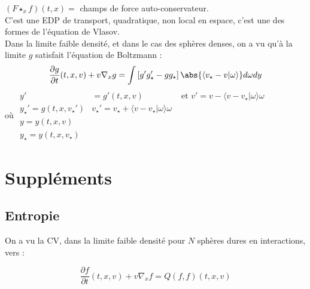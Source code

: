 \documentclass[12pt,a4paper]{article}
\begin{document}
	$(F\star_x f)(t,x) = $ champs de force auto-conservateur.\\
	C'est une EDP de transport, quadratique, non local en espace, c'est une des formes de l'équation de Vlasov.\\
	Dans la limite faible densité, et dans le cas des sphères denses, on a vu qu'à la limite $g$ satisfait l'équation de Boltzmann :
	\[
	\dfrac{\partial g}{\partial t}(t,x,v) + v\nabla_x g = \displaystyle\int\left[g'g'_\star - gg_\star\right]\abs{\langle v_\star - v|\omega\rangle}d\omega dy
	\]
	où $\begin{aligned}
		y' & = g'(t,x,v) & \text{ et } v' = v-\langle v-v_\star|\omega\rangle\omega\\
		y_\star' = g(t,x,v_\star') & v_\star' = v_\star + \langle v-v_\star|\omega\rangle\omega \\
		y = y(t,x,v)\\
		 y_\star = y(t,x,v_\star)
	\end{aligned}$

\section{Suppléments}
	
	\subsection{Entropie}
	
	On a vu la CV, dans la limite faible densité pour $N$ sphères dures en interactions, vers :
	
	\[
	\dfrac{\partial f}{\partial t}(t,x,v) + v\nabla_x f = Q(f,f)(t,x,v)
	\]
	
\end{document}
